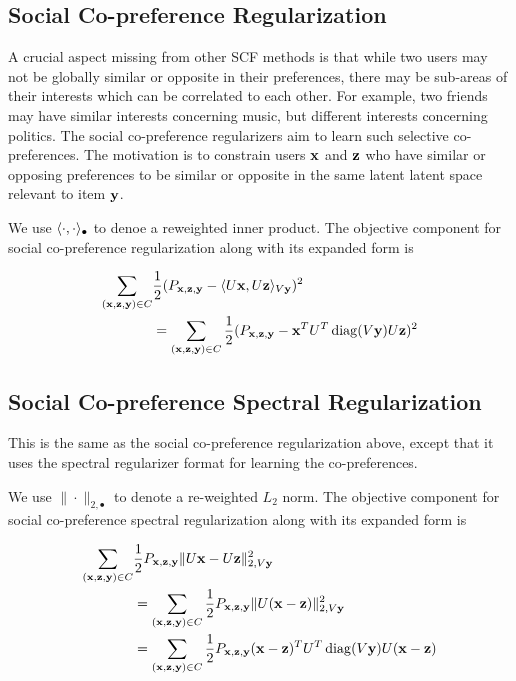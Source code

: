 \subsection{Social Co-preference Regularization}

A crucial aspect missing from other SCF methods is that while two users may not be globally similar or opposite 
in their preferences, there may be sub-areas of their interests which can be correlated to each other.
For example, two friends may have similar interests concerning music, but 
different interests concerning politics.  The social co-preference regularizers
aim to learn such selective co-preferences. The motivation is to constrain users $\mathbf{x}$
and $\mathbf{z}$ who have similar or opposing
preferences to be similar or opposite in the same latent latent space
relevant to item $\mathbf{y}$.  

We use $\langle \cdot, \cdot \rangle_{\bullet}$ to denoe a reweighted inner product. The objective component for 
social co-preference regularization along with its expanded form is

\begin{align}
\sum_{(\mathbf{x},\mathbf{z},\mathbf{y}) \in C} & \frac{1}{2} (P_{\mathbf{x},\mathbf{z},\mathbf{y}} - \langle U\mathbf{x}, U\mathbf{z} \rangle_{V\mathbf{y}})^2 \nonumber \\
& = \sum_{(\mathbf{x},\mathbf{z},\mathbf{y}) \in C} \frac{1}{2} (P_{\mathbf{x},\mathbf{z},\mathbf{y}} - \mathbf{x}^T U^T \operatorname{diag}(V\mathbf{y}) U \mathbf{z})^2
\end{align}


\subsection{Social Co-preference Spectral Regularization}
This is the same as the social co-preference regularization above, except that it uses the spectral regularizer format for 
learning the co-preferences.

 We use $\| \cdot \|_{2,\bullet}$ to denote a re-weighted $L_2$ norm. The objective component for
 social co-preference spectral regularization along with its expanded form is
 
\begin{align}
\sum_{(\mathbf{x},\mathbf{z},\mathbf{y}) \in C} & \frac{1}{2} P_{\mathbf{x},\mathbf{z},\mathbf{y}} \| U\mathbf{x} - U\mathbf{z} \|_{2,V\mathbf{y}}^2 \nonumber \\
& = \sum_{(\mathbf{x},\mathbf{z},\mathbf{y}) \in C} \frac{1}{2} P_{\mathbf{x},\mathbf{z},\mathbf{y}} \| U (\mathbf{x} - \mathbf{z}) \|_{2,V\mathbf{y}}^2 \nonumber \\
& = \sum_{(\mathbf{x},\mathbf{z},\mathbf{y}) \in C} \frac{1}{2} P_{\mathbf{x},\mathbf{z},\mathbf{y}} (\mathbf{x} - \mathbf{z})^T U^T \operatorname{diag}(V\mathbf{y}) U (\mathbf{x} - \mathbf{z})
\end{align}

